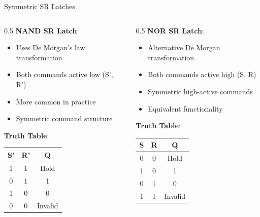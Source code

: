 \documentclass[aspectratio=169,11pt]{beamer}
\newcommand{\concept}[1]{\textbf{\color{accentcolor}#1}}
\begin{document}
\begin{frame}{Symmetric SR Latches}
\begin{columns}
\begin{column}{0.5\textwidth}
\concept{NAND SR Latch}:
\begin{itemize}
\item Uses De Morgan's law transformation
\item Both commands active low (S', R')
\item More common in practice
\item Symmetric command structure
\end{itemize}

\vspace{0.3cm}
\concept{Truth Table}:
\begin{center}
\begin{tabular}{|c|c|c|}
\hline
S' & R' & Q \\
\hline
1 & 1 & Hold \\
0 & 1 & 1 \\
1 & 0 & 0 \\
0 & 0 & Invalid \\
\hline
\end{tabular}
\end{center}
\end{column}
\begin{column}{0.5\textwidth}
\concept{NOR SR Latch}:
\begin{itemize}
\item Alternative De Morgan transformation
\item Both commands active high (S, R)
\item Symmetric high-active commands
\item Equivalent functionality
\end{itemize}

\vspace{0.3cm}
\concept{Truth Table}:
\begin{center}
\begin{tabular}{|c|c|c|}
\hline
S & R & Q \\
\hline
0 & 0 & Hold \\
1 & 0 & 1 \\
0 & 1 & 0 \\
1 & 1 & Invalid \\
\hline
\end{tabular}
\end{center}
\end{column}
\end{columns}

\vspace{0.3cm}
\begin{center}

\end{center}
\end{frame}
\end{document}
